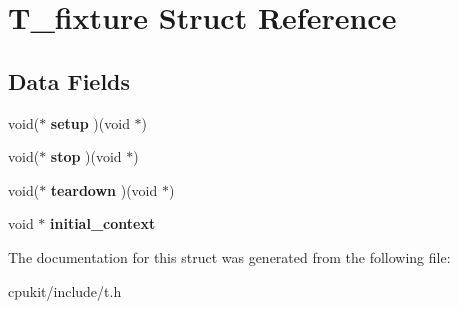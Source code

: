 \hypertarget{structT__fixture}{}\section{T\+\_\+fixture Struct Reference}
\label{structT__fixture}
\subsection*{Data Fields}
\begin{DoxyCompactItemize}
\item 
\mbox{\label{structT__fixture_a3453ad8b17af3779fce8abab2a6e5e70}} 
void($\ast$ {\bfseries setup} )(void $\ast$)
\item 
\mbox{\label{structT__fixture_abdb35a269064fce62ea227b40982c2de}} 
void($\ast$ {\bfseries stop} )(void $\ast$)
\item 
\mbox{\label{structT__fixture_a494763662487c3a983c085066f8ca549}} 
void($\ast$ {\bfseries teardown} )(void $\ast$)
\item 
\mbox{\label{structT__fixture_aa348eac27a36a67936b3166fad47dfbe}} 
void $\ast$ {\bfseries initial\+\_\+context}
\end{DoxyCompactItemize}


The documentation for this struct was generated from the following file\+:\begin{DoxyCompactItemize}
\item 
cpukit/include/t.\+h\end{DoxyCompactItemize}
